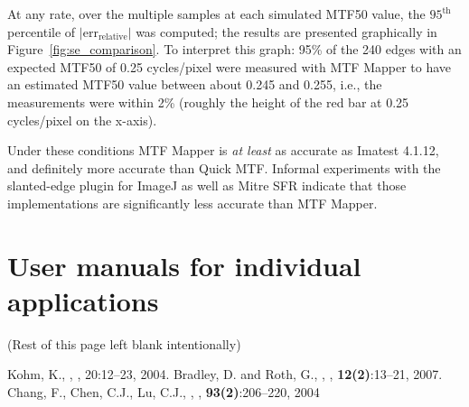 \documentclass[a4paper]{article}
\begin{document}
At any rate, over the multiple samples at each simulated MTF50 value, the
$95^\mathrm{th}$ percentile of $|\mathrm{err}_\mathrm{relative}|$ was
computed; the results are presented graphically in
Figure~\ref{fig:se_comparison}. To interpret this graph: 95\% of the 240
edges with an expected MTF50 of 0.25 cycles/pixel were measured with MTF
Mapper to have an estimated MTF50 value between about 0.245 and 0.255, i.e.,
the measurements were within 2\% (roughly the height of the red bar at 0.25
cycles/pixel on the x-axis).

Under these conditions MTF Mapper is
\emph{at least} as accurate as Imatest 4.1.12, and definitely more accurate
than Quick MTF. Informal experiments with the slanted-edge plugin for ImageJ
as well as Mitre SFR indicate that those implementations are significantly less
accurate than MTF Mapper.

\section{User manuals for individual applications}
\label{sec:manpages}
\begin{center}
(Rest of this page left blank intentionally)
\end{center}





\begin{thebibliography}{9}
 Kohm, K., , , 20:12--23, 2004.
 Bradley, D. and Roth, G.,
,
, \textbf{12(2)}:13--21,
2007.
 Chang, F., Chen, C.J., Lu, C.J.,
,
, \textbf{93(2)}:206--220,
2004
\end{thebibliography}
\end{document}
